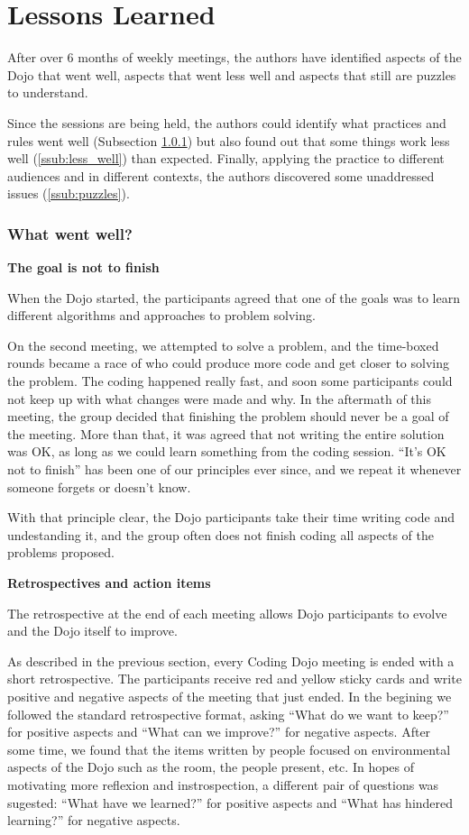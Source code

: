 \section{Lessons Learned}\label{sec:lessons_learned}

After over 6 months of weekly meetings, the authors have identified
aspects of the Dojo that went well, aspects that went less well and
aspects that still are puzzles to understand.

Since the sessions are being held, the authors could identify what
practices and rules went well (Subsection \ref{ssub:well}) but also
found out that some things work less well (\ref{ssub:less_well}) than
expected. Finally, applying the practice to different audiences and in
different contexts, the authors discovered some unaddressed issues
(\ref{ssub:puzzles}).

\subsubsection{What went well?}\label{ssub:well}

\noindent
\textbf{The goal is not to finish}

When the Dojo started, the participants agreed that one of the goals
was to learn different algorithms and approaches to problem solving.

On the second meeting, we attempted to solve a problem, and the
time-boxed rounds became a race of who could produce more code and get
closer to solving the problem. The coding happened really fast, and
soon some participants could not keep up with what changes were made
and why. In the aftermath of this meeting, the group decided that
finishing the problem should never be a goal of the meeting. More than
that, it was agreed that not writing the entire solution was OK, as
long as we could learn something from the coding session. ``It's OK
not to finish'' has been one of our principles ever since, and we
repeat it whenever someone forgets or doesn't know.

With that principle clear, the Dojo participants take their time
writing code and undestanding it, and the group often does not finish
coding all aspects of the problems proposed.

\noindent
\textbf{Retrospectives and action items}

The retrospective at the end of each meeting allows Dojo participants
to evolve and the Dojo itself to improve.

As described in the previous section, every Coding Dojo meeting is
ended with a short retrospective. The participants receive red and
yellow sticky cards and write positive and negative aspects of the
meeting that just ended. In the begining we followed the standard
retrospective format, asking ``What do we want to keep?''  for
positive aspects and ``What can we improve?'' for negative
aspects. After some time, we found that the items written by people
focused on environmental aspects of the Dojo such as the room, the
people present, etc. In hopes of motivating more reflexion and
instrospection, a different pair of questions was sugested: ``What
have we learned?'' for positive aspects and ``What has hindered
learning?'' for negative aspects.

